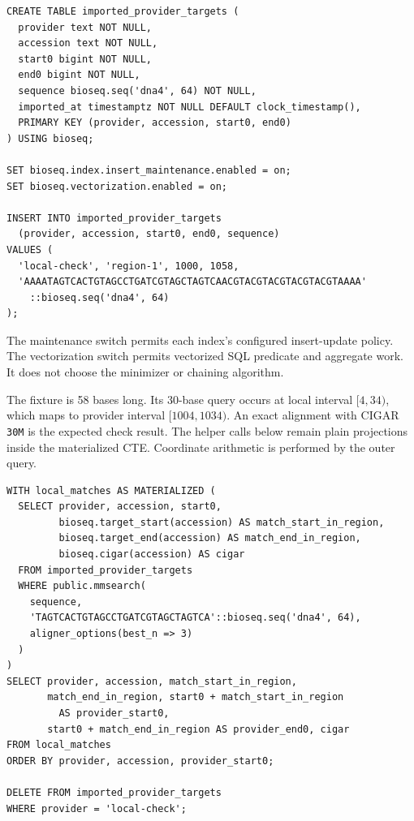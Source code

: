 \par\noindent\begin{minipage}{\linewidth}
\begin{lstlisting}[style=bioseq-appendix-sql]
CREATE TABLE imported_provider_targets (
  provider text NOT NULL,
  accession text NOT NULL,
  start0 bigint NOT NULL,
  end0 bigint NOT NULL,
  sequence bioseq.seq('dna4', 64) NOT NULL,
  imported_at timestamptz NOT NULL DEFAULT clock_timestamp(),
  PRIMARY KEY (provider, accession, start0, end0)
) USING bioseq;

SET bioseq.index.insert_maintenance.enabled = on;
SET bioseq.vectorization.enabled = on;

INSERT INTO imported_provider_targets
  (provider, accession, start0, end0, sequence)
VALUES (
  'local-check', 'region-1', 1000, 1058,
  'AAAATAGTCACTGTAGCCTGATCGTAGCTAGTCAACGTACGTACGTACGTACGTAAAA'
    ::bioseq.seq('dna4', 64)
);
\end{lstlisting}
\end{minipage}

The maintenance switch permits each index's configured insert-update policy.
The vectorization switch permits vectorized SQL predicate and aggregate work.
It does not choose the minimizer or chaining algorithm.

The fixture is 58 bases long. Its 30-base query occurs at local interval
\([4,34)\), which maps to provider interval \([1004,1034)\). An exact
alignment with CIGAR \texttt{30M} is the expected check result. The helper
calls below remain plain projections inside the materialized CTE. Coordinate
arithmetic is performed by the outer query.

\par\noindent\begin{minipage}{\linewidth}
\begin{lstlisting}[style=bioseq-appendix-sql]
WITH local_matches AS MATERIALIZED (
  SELECT provider, accession, start0,
         bioseq.target_start(accession) AS match_start_in_region,
         bioseq.target_end(accession) AS match_end_in_region,
         bioseq.cigar(accession) AS cigar
  FROM imported_provider_targets
  WHERE public.mmsearch(
    sequence,
    'TAGTCACTGTAGCCTGATCGTAGCTAGTCA'::bioseq.seq('dna4', 64),
    aligner_options(best_n => 3)
  )
)
SELECT provider, accession, match_start_in_region,
       match_end_in_region, start0 + match_start_in_region
         AS provider_start0,
       start0 + match_end_in_region AS provider_end0, cigar
FROM local_matches
ORDER BY provider, accession, provider_start0;

DELETE FROM imported_provider_targets
WHERE provider = 'local-check';
\end{lstlisting}
\end{minipage}

